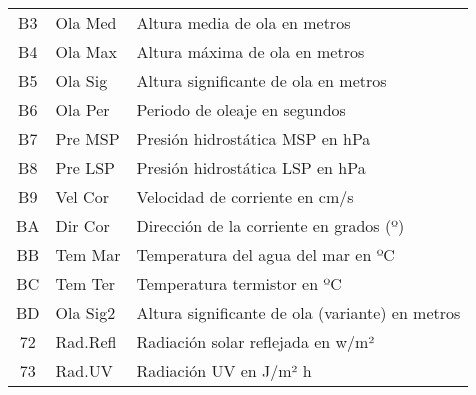 \begin{longtable}{|c|l|p{8.5cm}|}
	B3 & Ola Med & Altura media de ola en metros \\
	B4 & Ola Max & Altura máxima de ola en metros \\
	B5 & Ola Sig & Altura significante de ola en metros \\
	B6 & Ola Per & Periodo de oleaje en segundos \\
	B7 & Pre MSP & Presión hidrostática MSP en hPa \\
	B8 & Pre LSP & Presión hidrostática LSP en hPa \\
	B9 & Vel Cor & Velocidad de corriente en cm/s \\
	BA & Dir Cor & Dirección de la corriente en grados (º) \\
	BB & Tem Mar & Temperatura del agua del mar en ºC \\
	BC & Tem Ter & Temperatura termistor en ºC \\
	BD & Ola Sig2 & Altura significante de ola (variante) en metros \\
	72 & Rad.Refl & Radiación solar reflejada en w/m² \\
	73 & Rad.UV & Radiación UV en J/m² h \\
	\hline
\end{longtable}